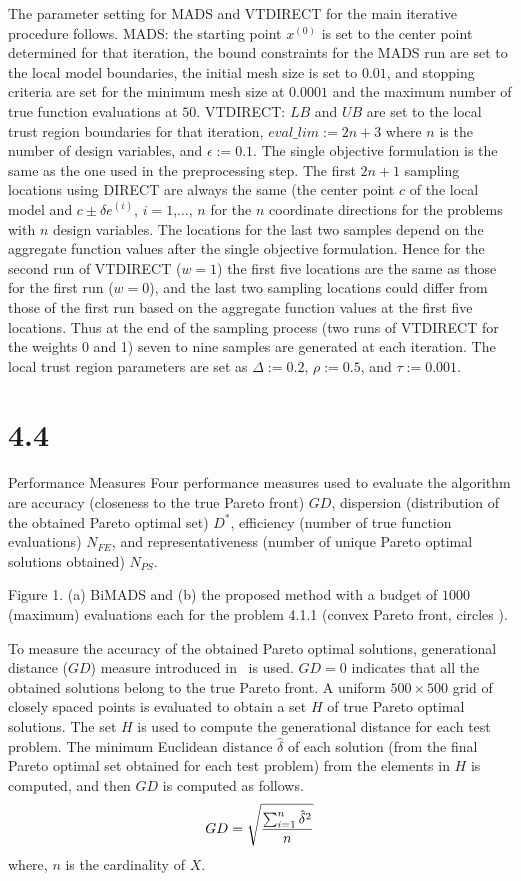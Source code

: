 The parameter setting for MADS and VTDIRECT for the main iterative procedure 
follows. MADS: the starting point $x^{(0)}$ is set to the center point 
determined for that iteration, the bound constraints for the MADS run are set to 
the local model boundaries, the initial mesh size is set to $0.01$, and 
stopping criteria are set for the minimum mesh size at $0.0001$ and the maximum 
number of true function evaluations at $50$. VTDIRECT: $LB$ and $UB$ are set to 
the local trust region boundaries for that iteration, $eval\_lim := 2n+3$ where 
$n$ is the number of design variables, and $\epsilon := 0.1$. The single 
objective formulation is the same as the one used in the preprocessing step. 
The first $2n+1$ sampling locations using DIRECT are always the same (the 
center point $c$ of the local model and $c\pm\delta e^{(i)}$, $i=1$,$\ldots$, 
$n$ for the $n$ coordinate directions for the problems with $n$ design 
variables. The locations for the last two samples depend on the aggregate 
function values after the single objective formulation. Hence for the 
second run of VTDIRECT ($w=1$) the first five locations are the same as those 
for the first run ($w=0$), and the last two sampling locations could differ 
from those of the first run based on the aggregate function values at the first 
five locations. Thus at the end of the sampling process (two runs of VTDIRECT 
for the weights 0 and 1) seven to nine samples are generated at each iteration. 
The local trust region parameters are set as $\Delta := 0.2$, $\rho := 0.5$, 
and $\tau := 0.001$.

\section{4.4}{Performance Measures}\vskip -3pt
Four performance measures used to evaluate the algorithm are 
accuracy (closeness to the true Pareto front) $GD$, dispersion (distribution of 
the obtained Pareto optimal set) $D^*$, efficiency (number of true 
function evaluations) $N_{FE}$, and representativeness (number of unique Pareto 
optimal solutions obtained) $N_{PS}$.

\topinsert
\vbox{
{\rmIX Figure 1. (a) BiMADS and (b) the proposed method with a budget of $1000$ 
(maximum) evaluations each for the problem 4.1.1 (convex Pareto front, circles
).}
}
\endinsert

To measure the accuracy of the obtained Pareto optimal solutions, generational 
distance ($GD$) measure introduced in \VL\ is used. $GD=0$ indicates that all 
the obtained solutions belong to the true Pareto front. A uniform $500\times  
{500}$ grid of closely spaced points is evaluated to obtain a set $H$ of true 
Pareto optimal solutions. The set $H$ is used to compute the generational 
distance for each test problem. The minimum Euclidean distance $\hat\delta$ of 
each solution (from the final Pareto optimal set obtained for each test 
problem) from the elements in $H$ is computed, and then $GD$ is computed as 
follows.
$$GD = \sqrt{{\sum_{i=1}^n {\hat\delta}^2}\over n}$$
\noindent where, $n$ is the cardinality of $X$.

